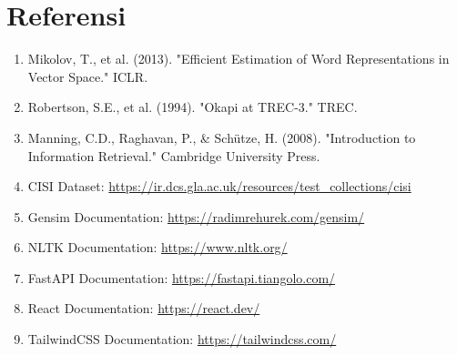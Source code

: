 \documentclass[12pt,a4paper]{report}
\begin{document}
\section{Referensi}
\begin{enumerate}
    \item Mikolov, T., et al. (2013). "Efficient Estimation of Word Representations in Vector Space." ICLR.
    \item Robertson, S.E., et al. (1994). "Okapi at TREC-3." TREC.
    \item Manning, C.D., Raghavan, P., \& Schütze, H. (2008). "Introduction to Information Retrieval." Cambridge University Press.
    \item CISI Dataset: \url{https://ir.dcs.gla.ac.uk/resources/test\_collections/cisi}
    \item Gensim Documentation: \url{https://radimrehurek.com/gensim/}
    \item NLTK Documentation: \url{https://www.nltk.org/}
    \item FastAPI Documentation: \url{https://fastapi.tiangolo.com/}
    \item React Documentation: \url{https://react.dev/}
    \item TailwindCSS Documentation: \url{https://tailwindcss.com/}
\end{enumerate}
\end{document}
